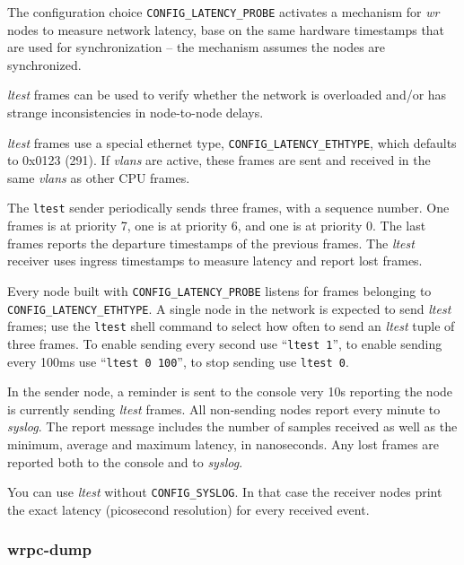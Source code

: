 \documentclass[a4paper, 12pt]{article}
\begin{document}
\begin{sloppypar} %
The configuration choice \texttt{CONFIG\_LATENCY\_PROBE} activates a
mechanism for \textit{wr} nodes to measure network latency, base on the same
hardware timestamps that are used for synchronization -- the mechanism
assumes the nodes are synchronized.

\textit{ltest} frames can be used to verify whether the network is
overloaded and/or has strange inconsistencies in node-to-node delays.

\textit{ltest} frames use a special ethernet type, \texttt{CONFIG\_LATENCY\_ETHTYPE},
which defaults to 0x0123 (291). If \textit{vlans} are active, these frames
are sent and received in the same \textit{vlans} as other CPU frames.

The \texttt{ltest} sender periodically sends three frames, with a sequence
number. One frames is at priority 7, one is at priority 6, and one is
at priority 0. The last frames reports the departure timestamps of the
previous frames.  The \textit{ltest} receiver uses ingress timestamps to
measure latency and report lost frames.

Every node built with \texttt{CONFIG\_LATENCY\_PROBE} listens for frames
belonging to \texttt{CONFIG\_LATENCY\_ETHTYPE}.  A single node in the
network is expected to send \textit{ltest} frames; use the \texttt{ltest}
shell command to select how often to send an \textit{ltest} tuple of three
frames. To enable sending every second use ``\texttt{ltest 1}'', to enable
sending every 100ms use ``\texttt{ltest 0 100}'', to stop sending use
\texttt{ltest 0}.

In the sender node, a reminder is sent to the console very 10s
reporting the node is currently sending \textit{ltest} frames.  All
non-sending nodes report every minute to \textit{syslog}. The
report message includes the number of samples received as well
as the minimum, average and maximum latency, in nanoseconds.
Any lost frames are reported both to the console and to \textit{syslog}.

You can use \textit{ltest} without \texttt{CONFIG\_SYSLOG}. In that case the
receiver nodes print the exact latency (picosecond resolution) for
every received event.
\end{sloppypar}

\subsubsection{wrpc-dump}
\label{wrpc-dump}
\end{document}
